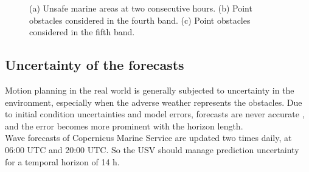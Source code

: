 \begin{figure}[H]
	\centering 
	\hspace{9cm}
	\hspace{1cm}
	\vspace{0.0cm}
	\captionsetup{font=footnotesize,labelfont=footnotesize}
	\caption{(a) Unsafe marine areas at two consecutive hours. (b) Point obstacles considered in the fourth band.  (c) Point obstacles considered in the fifth band.} 
	\label{localobs}
\end{figure}

\subsection{Uncertainty of the forecasts}
Motion planning in the real world is generally subjected to uncertainty in the environment, especially when the adverse weather represents the obstacles. Due to initial condition uncertainties and model errors, forecasts are never accurate \cite{slingo2011uncertainty}, and the error becomes more prominent with the horizon length.\\
Wave forecasts of Copernicus Marine Service are updated two times daily, at 06:00 UTC and 20:00 UTC. So the USV should manage prediction uncertainty for a temporal horizon of 14 h.

